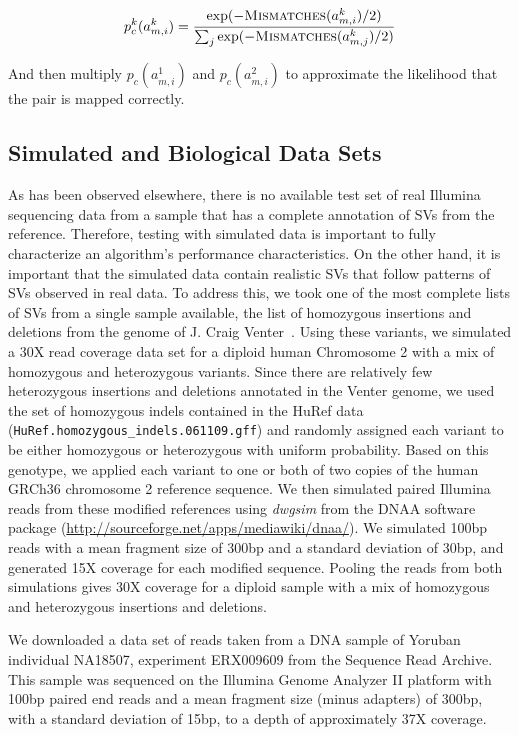 \documentclass[11pt]{article}
\begin{document}
\[ p^{k}_c(a^{k}_{m,i}) = \frac{\exp({-\textsc{Mismatches}(a^{k}_{m,i})/2)}}{\sum_j{\exp(-\textsc{Mismatches}(a^{k}_{m,j})/2)}} \]

And then multiply $p_c(a^{1}_{m,i})$ and $p_c(a^{2}_{m,i})$ to approximate the likelihood that the pair is mapped correctly.

\subsection{Simulated and Biological Data Sets}\label{section_eval_data_sets}

As has been observed elsewhere, there is no available test set of real Illumina sequencing data from a sample that has a complete annotation of SVs from the reference. Therefore, testing with simulated data is important to fully characterize an algorithm's performance characteristics. On the other hand, it is important that the simulated data contain realistic SVs that follow patterns of SVs observed in real data. To address this, we took one of the most complete lists of SVs from a single sample available, the list of homozygous insertions and deletions from the genome of J. Craig Venter~\citep{Levy:2007fb}. Using these variants, we simulated a 30X read coverage data set for a diploid human Chromosome 2 with a mix of homozygous and heterozygous variants.  Since there are relatively few heterozygous insertions and deletions annotated in the Venter genome, we used the set of homozygous indels contained in the HuRef data (\texttt{HuRef.homozygous\_indels.061109.gff}) and randomly assigned each variant to be either homozygous or heterozygous with uniform probability. Based on this genotype, we applied each variant to one or both of two copies of the human GRCh36 chromosome 2 reference sequence. We then simulated paired Illumina reads from these modified references using \emph{dwgsim} from the DNAA software package (\url{http://sourceforge.net/apps/mediawiki/dnaa/}). We simulated 100bp reads with a mean fragment size of 300bp and a standard deviation of 30bp, and generated 15X coverage for each modified sequence. Pooling the reads from both simulations gives 30X coverage for a diploid sample with a mix of homozygous and heterozygous insertions and deletions.

We downloaded a data set of reads taken from a DNA sample of Yoruban individual NA18507, experiment ERX009609 from the Sequence Read Archive. This sample was sequenced on the Illumina Genome Analyzer II platform with 100bp paired end reads and a mean fragment size (minus adapters) of 300bp, with a standard deviation of 15bp, to a depth of approximately 37X coverage.
\end{document}
